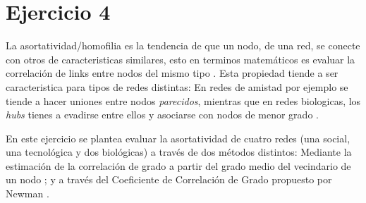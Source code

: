 \section{Ejercicio 4}
La asortatividad/homofilia es la tendencia de que un nodo, de una red, se conecte con otros 
de caracteristicas similares, esto en terminos matem\'aticos es evaluar la correlaci\'on
de links entre nodos del mismo tipo \citep{newman2003}. Esta propiedad tiende a ser caracteristica 
para tipos de redes distintas: En redes de amistad por ejemplo se tiende a hacer uniones entre
nodos \textit{parecidos}, mientras que en redes biologicas, los \textit{hubs} tienes a evadirse 
entre ellos y asociarse con nodos de menor grado \citep{newman,barabasi}. 

En este ejercicio se plantea evaluar la asortatividad de cuatro redes (una social, una tecnol\'ogica y dos biol\'ogicas) a trav\'es
de dos m\'etodos distintos: Mediante la estimaci\'on de la correlaci\'on de grado a partir del grado medio del
vecindario de un nodo \citep{barabasi}; y a trav\'es del Coeficiente de Correlaci\'on de Grado propuesto por Newman
\citep{newman2003,newman}.

